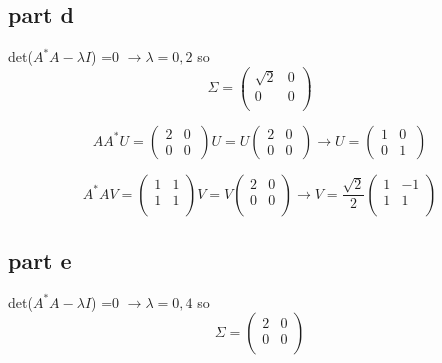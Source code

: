 \documentclass[a4paper,12pt]{article}
\begin{document}
\subsection{part d}
det($A^*A - \lambda I$) =0 $\rightarrow \lambda=0,2$ so 
\begin{equation}
\Sigma=\begin{pmatrix}
\sqrt2&0	\\
0&0\\ 
\end{pmatrix}
\end{equation}

\begin{equation}
AA^*U=\begin{pmatrix}
2&0	\\
0&0\
\end{pmatrix}  U =U \begin{pmatrix}
2&0	\\
0&0\
\end{pmatrix} \rightarrow U=\begin{pmatrix}
1&0	\\
0&1\
\end{pmatrix} 
\end{equation}

\begin{equation}
A^*AV=\begin{pmatrix}
1&1	\\
1&1\\ 
\end{pmatrix}  V = V\begin{pmatrix}
2&0	\\
0&0\\ 
\end{pmatrix} \rightarrow  V=\frac{\sqrt2}{2}\begin{pmatrix}
1&-1	\\
1&1\\ 
\end{pmatrix}  
\end{equation}

\subsection{part e}
det($A^*A - \lambda I$) =0 $\rightarrow \lambda=0,4$ so 
\begin{equation}
\Sigma=\begin{pmatrix}
2&0	\\
0&0\\ 
\end{pmatrix}
\end{equation}
\end{document}

